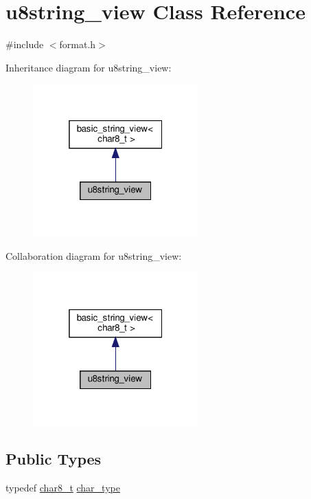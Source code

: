 \hypertarget{classu8string__view}{}\section{u8string\+\_\+view Class Reference}
\label{classu8string__view}


{\ttfamily \#include $<$format.\+h$>$}



Inheritance diagram for u8string\+\_\+view\+:
\nopagebreak
\begin{figure}[H]
\begin{center}
\leavevmode
\includegraphics[width=181pt]{classu8string__view__inherit__graph}
\end{center}
\end{figure}


Collaboration diagram for u8string\+\_\+view\+:
\nopagebreak
\begin{figure}[H]
\begin{center}
\leavevmode
\includegraphics[width=181pt]{classu8string__view__coll__graph}
\end{center}
\end{figure}
\subsection*{Public Types}
\begin{DoxyCompactItemize}
\item 
typedef \hyperlink{format_8h_ad71c872603735b57c8417f76de44077b}{char8\+\_\+t} \hyperlink{classu8string__view_af54c5d2c42c445a7031e8ec2b5b458be}{char\+\_\+type}
\end{DoxyCompactItemize}

